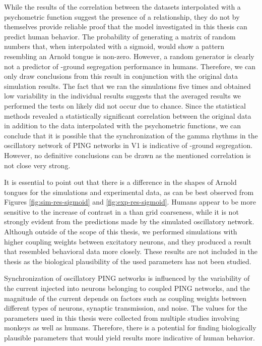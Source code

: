While the results of the correlation between the datasets interpolated with a psychometric function suggest the presence of a relationship, they do not by themselves provide reliable proof that the model investigated in this thesis can predict human behavior. The probability of generating a matrix of random numbers that, when interpolated with a sigmoid, would show a pattern resembling an Arnold tongue is non-zero.
However, a random generator is clearly not a predictor of \stimfig-ground segregation performance in humans. Therefore, we can only draw conclusions from this result in conjunction with the original data simulation results. The fact that we ran the simulations five times and obtained low variability in the individual results suggests that the averaged results we performed the tests on likely did not occur due to chance.
Since the statistical methods revealed a statistically significant correlation between the original data in addition to the data interpolated with the psychometric functions, we can conclude that it is possible that the synchronization of the gamma rhythms in the oscillatory network of PING networks in V1 is indicative of \stimfig-ground segregation. However, no definitive conclusions can be drawn as the mentioned correlation is not close very strong.

It is essential to point out that there is a difference in the shapes of Arnold tongues for the simulations and experimental data, as can be best observed from Figures \ref{fig:sim-res-sigmoid} and \ref{fig:exp-res-sigmoid}. Humans appear to be more sensitive to the increase of contrast in a \stimfig{} than grid coarseness, while it is not strongly evident from the predictions made by the simulated oscillatory network. Although outside of the scope of this thesis, we performed simulations with higher coupling weights between excitatory neurons, and they produced a result that resembled behavioral data more closely. These results are not included in the thesis as the biological plausibility of the used parameters has not been studied.

Synchronization of oscillatory PING networks is influenced by the variability of the current injected into neurons belonging to coupled PING networks, and the magnitude of the current depends on factors such as coupling weights between different types of neurons, synaptic transmission, and noise. The values for the parameters used in this thesis were collected from multiple studies involving monkeys as well as humans. Therefore, there is a potential for finding biologically plausible parameters that would yield results more indicative of human behavior.

